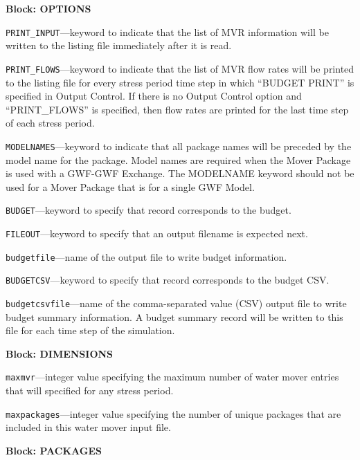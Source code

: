 
\item \textbf{Block: OPTIONS}

\begin{description}
\item \texttt{PRINT\_INPUT}---keyword to indicate that the list of MVR information will be written to the listing file immediately after it is read.

\item \texttt{PRINT\_FLOWS}---keyword to indicate that the list of MVR flow rates will be printed to the listing file for every stress period time step in which ``BUDGET PRINT'' is specified in Output Control.  If there is no Output Control option and ``PRINT\_FLOWS'' is specified, then flow rates are printed for the last time step of each stress period.

\item \texttt{MODELNAMES}---keyword to indicate that all package names will be preceded by the model name for the package.  Model names are required when the Mover Package is used with a GWF-GWF Exchange.  The MODELNAME keyword should not be used for a Mover Package that is for a single GWF Model.

\item \texttt{BUDGET}---keyword to specify that record corresponds to the budget.

\item \texttt{FILEOUT}---keyword to specify that an output filename is expected next.

\item \texttt{budgetfile}---name of the output file to write budget information.

\item \texttt{BUDGETCSV}---keyword to specify that record corresponds to the budget CSV.

\item \texttt{budgetcsvfile}---name of the comma-separated value (CSV) output file to write budget summary information.  A budget summary record will be written to this file for each time step of the simulation.

\end{description}
\item \textbf{Block: DIMENSIONS}

\begin{description}
\item \texttt{maxmvr}---integer value specifying the maximum number of water mover entries that will specified for any stress period.

\item \texttt{maxpackages}---integer value specifying the number of unique packages that are included in this water mover input file.

\end{description}
\item \textbf{Block: PACKAGES}

